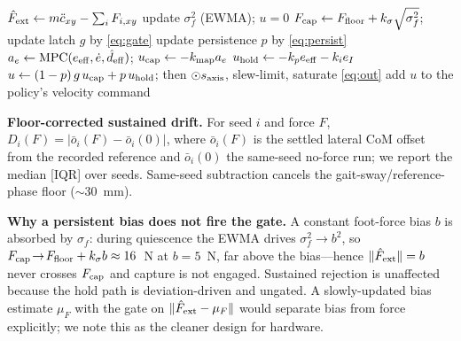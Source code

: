 \documentclass[journal]{IEEEtran}
\begin{document}
\begin{algorithm}[t]
\caption{Confidence-gated capture--hold arbitration (per 50~Hz step)}
\label{alg:layer}
\begin{algorithmic}[1]
\State $\hat F_{\rm ext}\gets m\ddot c_{xy}-\sum_i F_{i,xy}$ 
 update $\sigma_f^2$ (EWMA); \Return $u=0$ 
\EndIf
\State $F_{\rm cap}\gets F_{\rm floor}+k_\sigma\sqrt{\sigma_f^2}$; update latch $g$ by \eqref{eq:gate}
\State update persistence $p$ by \eqref{eq:persist}
\State $a_e\gets\mathrm{MPC}(e_{\rm eff},\dot e,\hat d_{\rm eff})$; $u_{\rm cap}\gets-k_{\rm map}a_e$
\State $u_{\rm hold}\gets-k_p e_{\rm eff}-k_i e_I$ 
\State $u\gets(1-p)\,g\,u_{\rm cap}+p\,u_{\rm hold}$; then $\odot s_{\rm axis}$, slew-limit, saturate \eqref{eq:out}
\State add $u$ to the policy's velocity command
\end{algorithmic}
\end{algorithm}

\textbf{Floor-corrected sustained drift.} For seed $i$ and force $F$, $D_i(F)=|\bar o_i(F)-\bar o_i(0)|$, where $\bar o_i(F)$ is the settled lateral CoM offset from the recorded reference and $\bar o_i(0)$ the same-seed no-force run; we report the median [IQR] over seeds. Same-seed subtraction cancels the gait-sway/reference-phase floor ($\sim$30~mm).

\textbf{Why a persistent bias does not fire the gate.} A constant foot-force bias $b$ is absorbed by $\sigma_f$: during quiescence the EWMA drives $\sigma_f^2\!\to\!b^2$, so $F_{\rm cap}\!\to\!F_{\rm floor}+k_\sigma b\approx16$~N at $b=5$~N, far above the bias---hence $\|\hat F_{\rm ext}\|=b$ never crosses $F_{\rm cap}$ and capture is not engaged. Sustained rejection is unaffected because the hold path is deviation-driven and ungated. A slowly-updated bias estimate $\mu_F$ with the gate on $\|\hat F_{\rm ext}-\mu_F\|$ would separate bias from force explicitly; we note this as the cleaner design for hardware.
\end{document}
